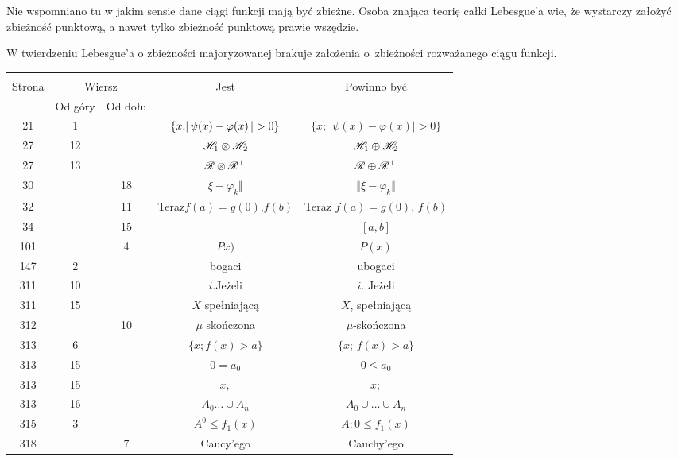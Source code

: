 \documentclass[a4paper,11pt]{article}
\begin{document}
 Nie wspomniano tu w jakim sensie dane ciągi funkcji
mają być zbieżne. Osoba znająca teorię całki Lebesgue'a wie, że
wystarczy założyć zbieżność punktową, a nawet tylko zbieżność
punktową prawie wszędzie.

\vspace{\spaceFour}



 W twierdzeniu Lebesgue'a o zbieżności majoryzowanej
brakuje założenia o~zbieżności rozważanego ciągu funkcji.







\begin{center}

  \begin{tabular}{|c|c|c|c|c|}
    \hline
    & \multicolumn{2}{c|}{} & & \\
    Strona & \multicolumn{2}{c|}{Wiersz} & Jest
                              & Powinno być \\ \cline{2-3}
    & Od góry & Od dołu & & \\
    \hline
    21  &  1 & & $\{ x ,\! |\, {  \psi( x ) - \varphi( x )  } \,| > 0 \}$
           & $\{ x ;\, | \psi( x ) - \varphi( x )| > 0 \}$ \\
    27  & 12 & & $\mathcal{H}_{ 1 } \otimes \mathcal{H}_{ 2 }$ & $\mathcal{H}_{ 1 } \oplus \mathcal{H}_{ 2 }$ \\
    27  & 13 & & $\mathcal{R} \otimes \mathcal{R}^{ \bot }$ & $\mathcal{R} \oplus \mathcal{R}^{ \bot }$ \\
    30  & & 18 & $\xi - \varphi_{ k } \Vert$ & $\Vert \xi - \varphi_{ k } \Vert$ \\
    32  & & 11 & Teraz$f( a ) = g( 0 )$,$f( b )$
           & Teraz $f( a ) = g( 0 )$, $f( b )$ \\
    34  & & 15 & & $[ a, b ]$ \\
    101 & &  4 & $Px )$ & $P( x )$ \\
    147 &  2 & & bogaci & ubogaci \\
    311 & 10 & & $i$.Jeżeli & $i$. Jeżeli \\
    311 & 15 & & $X$ spełniającą & $X$, spełniającą \\
    312 & & 10 & $\mu$ skończona & $\mu$-skończona \\
    313 &  6 & & $\{ x ;\! f( x ) > a \}$ & $\{ x ;\, f( x ) > a \}$ \\
    313 & 15 & & $0 = a_{ 0 }$ & $0 \leq a_{ 0 }$ \\
    313 & 15 & & $x,$ & $x;$ \\
    313 & 16 & & $A_{ 0 } \ldots \cup A_{ n }$
           & $A_{ 0 } \cup \ldots \cup A_{ n }$ \\
    315 & 3 & & $A^{ 0 } \leq f_{ 1 }( x )$ & $A: 0 \leq f_{ 1 }( x )$ \\
    318 & & 7 & Caucy'ego & Cauchy'ego \\
    \hline
  \end{tabular}

\end{center}
\end{document}

